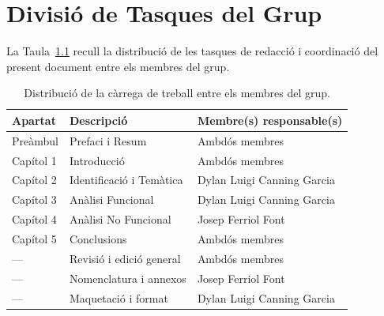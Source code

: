 \chapter{Divisió de Tasques del Grup}
\label{appendix:tasques}

La Taula~\ref{tab:taskdivision} recull la distribució de les tasques de redacció i coordinació del present document entre els membres del grup.

\begin{table}[htb]
    \setlength\extrarowheight{4pt}
    \centering
    \caption{Distribució de la càrrega de treball entre els membres del grup.}
    \label{tab:taskdivision}
    \begin{tabularx}{\textwidth}{llX}
        \toprule
        \textbf{Apartat} & \textbf{Descripció} & \textbf{Membre(s) responsable(s)} \\
        \midrule
        Preàmbul       & Prefaci i Resum          & Ambdós membres \\
        Capítol 1      & Introducció              & Ambdós membres \\
        Capítol 2      & Identificació i Temàtica & Dylan Luigi Canning Garcia \\
        Capítol 3      & Anàlisi Funcional        & Dylan Luigi Canning Garcia \\
        Capítol 4      & Anàlisi No Funcional     & Josep Ferriol Font \\
        Capítol 5      & Conclusions              & Ambdós membres \\
        \midrule
        ---            & Revisió i edició general & Ambdós membres \\
        ---            & Nomenclatura i annexos   & Josep Ferriol Font \\
        ---            & Maquetació i format      & Dylan Luigi Canning Garcia \\
        \bottomrule
    \end{tabularx}
\end{table}
